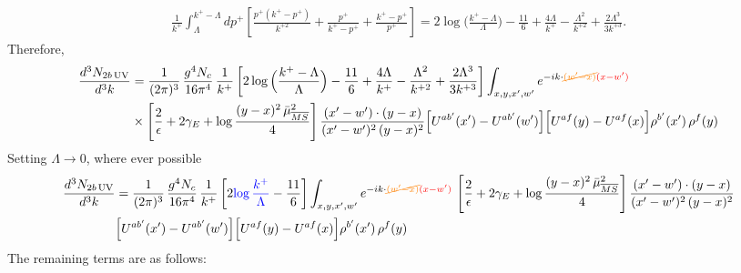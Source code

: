 \documentclass[9pt]{article}
\numberwithin{equation}{section}
\begin{document}
\begin{align}
\frac{1}{k^{+}}\int_{\Lambda}^{k^{+}-\Lambda}dp^{+}\left[\frac{p^{+}(k^{+}-p^{+})}{k^{+2}}+\frac{p^{+}}{k^{+}-p^{+}}+\frac{k^{+}-p^{+}}{p^{+}}\right]=2\log\Big(\frac{k^{+}-\Lambda}{\Lambda}\Big)-\frac{11}{6}+\frac{4\Lambda}{k^{+}}-\frac{\Lambda^{2}}{k^{+2}}+\frac{2\Lambda^{3}}{3k^{+3}} .
\end{align}
Therefore,
\begin{align}
\frac{d^{3}N_{2b\,\rm UV}}{d^{3}k}&=\frac{1}{(2\pi)^{3}}\,\frac{g^{4}N_{c}}{16\pi^{4}}\,\frac{1}{k^{+}}\left[2\log\Big(\frac{k^{+}-\Lambda}{\Lambda}\Big)-\frac{11}{6}+\frac{4\Lambda}{k^{+}}-\frac{\Lambda^{2}}{k^{+2}}+\frac{2\Lambda^{3}}{3k^{+3}}\right]\int_{x,y,x',w'}e^{-ik\cdot{\color{orange}\cancel{(w'-x)}}{\color{red}(x-w')}}\notag\\
&\times\left[\frac{2}{\epsilon}+2\gamma_{E}+\log\frac{(y-x)^{2}\,\bar\mu^{2}_{\overline{MS}}}{4}\right]\frac{(x'-w')\cdot(y-x)}{(x'-w')^{2}\,(y-x)^{2}}\Big[U^{ab'}(x')-U^{ab'}(w')\Big]\Big[U^{af}(y)-U^{af}(x)\Big]\rho^{b'}(x')\,\rho^{f}(y)
\end{align}
Setting $\Lambda\to 0$, where ever possible
\begin{align}
\frac{d^{3}N_{2b\,\rm UV}}{d^{3}k}&=\frac{1}{(2\pi)^{3}}\,\frac{g^{4}N_{c}}{16\pi^{4}}\,\frac{1}{k^{+}}\left[2{\color{blue}\log\frac{k^{+}}{\Lambda}}-\frac{11}{6}\right]\int_{x,y,x',w'}e^{-ik\cdot{\color{orange}\cancel{(w'-x)}}{\color{red}(x-w')}}\,\left[\frac{2}{\epsilon}+2\gamma_{E}+\log\frac{(y-x)^{2}\,\bar\mu^{2}_{\overline{MS}}}{4}\right]\frac{(x'-w')\cdot(y-x)}{(x'-w')^{2}\,(y-x)^{2}}\notag \\ & \Big[U^{ab'}(x')-U^{ab'}(w')\Big]\Big[U^{af}(y)-U^{af}(x)\Big]\rho^{b'}(x')\,\rho^{f}(y)
\end{align}   
The remaining terms are as follows: 
\end{document}
